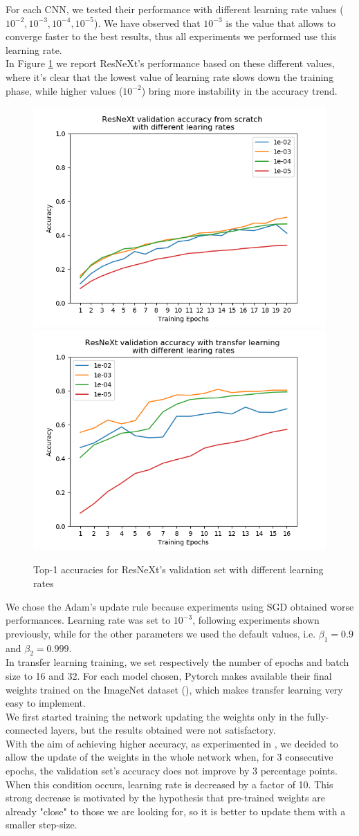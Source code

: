\documentclass{article}
\begin{document}
For each CNN, we tested their performance with different learning rate values ($10^{-2}, 10^{-3}, 10^{-4}, 10^{-5}$). We have observed that $10^{-3}$ is the value that allows to converge faster to the best results, thus all experiments we performed use this learning rate.\\
In Figure \ref{fig:lr} we report ResNeXt's performance based on these different values, where it's clear that the lowest value of learning rate slows down the training phase, while higher values ($10^{-2}$) bring more instability in the accuracy trend.
\begin{figure}[h]
	\centering
	\includegraphics[width=.5\textwidth]{graphs/lr_scratch}\hfill
	\includegraphics[width=.5\textwidth]{graphs/lr_tl}
	\caption{Top-1 accuracies for ResNeXt's validation set with different learning rates}
	\label{fig:lr}
\end{figure}
We chose the Adam's update rule because experiments using SGD obtained worse performances. Learning rate was set to $10^{-3}$, following experiments shown previously, while for the other parameters we used the default values, i.e. $\beta_{1}  = 0.9$ and $\beta_{2} = 0.999$.\\
In transfer learning training, we set respectively the number of epochs and batch size to 16 and 32.  For each model chosen, Pytorch makes available their final weights  trained on the ImageNet dataset (\cite{imagenet}), which makes transfer learning very easy to implement.\\
We first started training the network updating the weights only in the fully-connected layers, but the results obtained were not satisfactory.\\
With the aim of achieving higher accuracy, as experimented in \cite{ArtistIdCNN406}, we decided to allow the update of the weights in the whole network when, for 3 consecutive epochs, the validation set's accuracy does not improve by 3 percentage points. When this condition occurs, learning rate is decreased by a factor of 10. This strong decrease is motivated by the hypothesis  that pre-trained weights are already "close" to those we are looking for, so it is better to update them with a smaller step-size.
\end{document}
